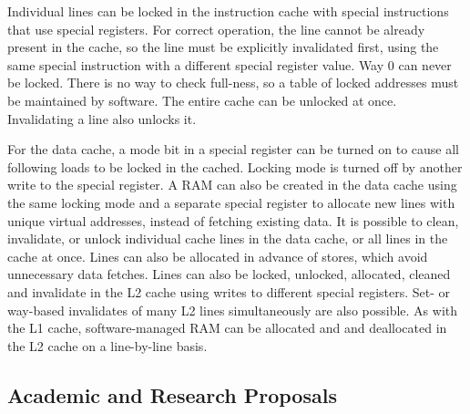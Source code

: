 Individual lines can be locked in the instruction cache with special instructions that use special registers.
For correct operation, the line cannot be already present in the cache, so the line must be explicitly invalidated first, using the same special instruction with a different special register value. Way 0 can never be locked. There is no way to check full-ness, so a table of locked addresses must be maintained by software. The entire cache can be unlocked at once. Invalidating a line also unlocks it.

For the data cache, a mode bit in a special register can be turned on to cause all following loads to be locked in the cached. Locking mode is turned off by another write to the special register.
A RAM can also be created in the data cache using the same locking mode and a separate special register to allocate new lines with unique virtual addresses, instead of fetching existing data.
It is possible to clean, invalidate, or unlock individual cache lines in the data cache, or all lines in the cache at once. Lines can also be allocated in advance of stores, which avoid unnecessary data fetches.
Lines can also be locked, unlocked, allocated, cleaned and invalidate in the L2 cache using writes to different special registers. Set- or way-based invalidates of many L2 lines simultaneously are also possible.
As with the L1 cache, software-managed RAM can be allocated and  and deallocated in the L2 cache on a line-by-line basis.

\subsection{Academic and Research Proposals}


